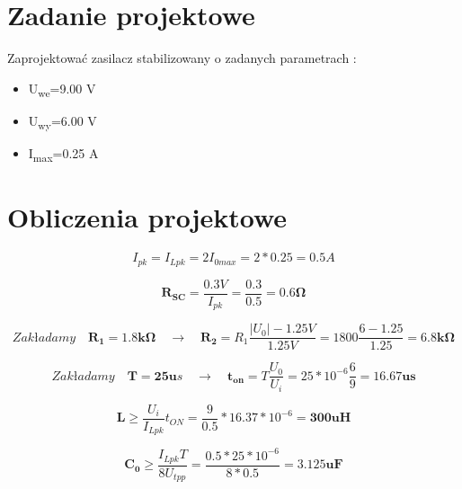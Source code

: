 \documentclass[a4paper,12pt]{article}
\begin{document}
\section{Zadanie projektowe}
Zaprojektować zasilacz stabilizowany o zadanych parametrach :
\begin{itemize}
\item U\textsubscript{we}=9.00 V
\item U\textsubscript{wy}=6.00 V
\item I\textsubscript{max}=0.25 A
\end{itemize}
\section{Obliczenia projektowe}

\begin{equation}
I_{pk}=I_{Lpk}=2I_{0max}=2*0.25=0.5 A
\end{equation}

\begin{equation}
\mathbf{R_{SC}}=\frac{0.3V}{I_{pk}}=\frac{0.3}{0.5}=\mathbf{0.6 \Omega}
\end{equation}

\begin{equation}
Zakładamy \quad \mathbf{R_1=1.8k\Omega}   \quad \to \quad   \mathbf{R_2}=R_1 \frac {|U_0|-1.25V}{1.25V} = 1800\frac{6-1.25}{1.25}= \mathbf{6.8k \Omega}
\end{equation}

\begin{equation}
Zakładamy \quad \mathbf{T=25u}s \quad \to \quad \mathbf{t_{on}}=T\frac{U_0}{U_i}=25*10^{-6}\frac{6}{9}=\mathbf{16.67us}
\end{equation}

\begin{equation}
\mathbf{L}\geq\frac{U_i}{I_{Lpk}}t_{ON}=\frac{9}{0.5}*16.37*10^{-6}=\mathbf{300uH}
\end{equation}

\begin{equation}
\mathbf{C_0}\geq\frac{I_{Lpk}T}{8U_{tpp}}=\frac{0.5*25*10^{-6}}{8*0.5}=\mathbf{3.125uF}
\end{equation}
\end{document}
